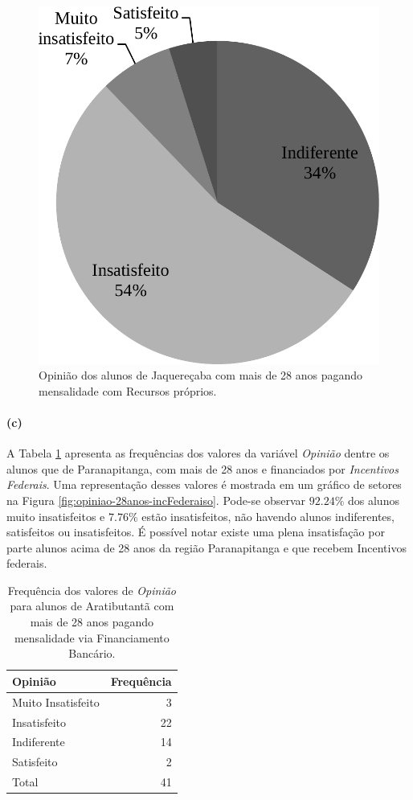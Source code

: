 \documentclass[10pt,a4paper,oneside]{article}
\newcommand{\arat}{Aratibutantã\xspace}
\newcommand{\jaqu}{Jaquereçaba\xspace}
\newcommand{\para}{Paranapitanga\xspace}
\begin{document}
\begin{figure}[!h]
	\centering
	\includegraphics[width=.6\linewidth]{plots/q17b.pdf}
	\caption{Opinião dos alunos de \jaqu com mais de 28 anos pagando mensalidade com Recursos próprios.}
	\label{fig:opiniao-28anos-proprios}
\end{figure}

\paragraph{(c)}

A Tabela \ref{table:opiniao-28anos-incFederais} apresenta as frequências dos valores da variável \textit{Opinião} dentre os alunos que de \para, com mais de 28 anos e financiados por \textit{Incentivos Federais}. Uma representação desses valores é mostrada em um gráfico de setores na Figura \ref{fig:opiniao-28anos-incFederaiso}.
Pode-se observar $92.24\%$ dos alunos muito insatisfeitos e $7.76\%$ estão insatisfeitos, não havendo alunos indiferentes, satisfeitos ou insatisfeitos.
É possível notar existe uma plena insatisfação por parte alunos acima de 28 anos da região \para e que recebem Incentivos federais.

\begin{table}[!h]
	\small
	\centering
	\caption{Frequência dos valores de \textit{Opinião} para alunos de \arat com mais de 28 anos pagando mensalidade via Financiamento Bancário.}
	\label{table:opiniao-28anos-incFederais}
	\begin{tabular}{l r}
		\toprule
		\textbf{Opinião}    & \textbf{Frequência} \\
		\midrule
		Muito Insatisfeito  &  3  \\
		Insatisfeito        &  22 \\
		Indiferente         &  14 \\
		Satisfeito          &  2  \\
		\midrule
		Total               &  41 \\
		\bottomrule
	\end{tabular}
\end{table}
\end{document}

